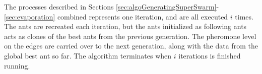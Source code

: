 The processes described in Sections \ref{sec:algoGeneratingSuperSwarm}-\ref{sec:evaporation} combined represents one iteration, and are all executed $i$ times. The ants are recreated each iteration, but the ants initialized as following ants acts as clones of the best ants from the previous generation. The pheromone level on the edges are carried over to the next generation, along with the data from the global best ant so far. The algorithm terminates when $i$ iterations is finished running. 